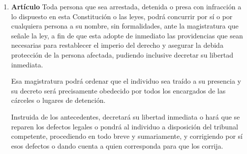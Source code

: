 \documentclass[11pt, a4paper]{article}
\begin{document}
\begin{enumerate}
\item \textbf{Artículo} \newline
Toda persona que sea arrestada, detenida o presa con infracción a lo dispuesto en esta Constitución o las leyes, podrá concurrir por sí o por cualquiera persona a su nombre, sin formalidades, ante la magistratura que señale la ley, a fin de que esta adopte de inmediato las providencias que sean necesarias para restablecer el imperio del derecho y asegurar la debida protección de la persona afectada, pudiendo inclusive decretar su libertad inmediata. 

Esa magistratura podrá ordenar que el individuo sea traído a su presencia y su decreto será precisamente obedecido por todos los encargados de las cárceles o lugares de detención. 

Instruida de los antecedentes, decretará su libertad inmediata o hará que se reparen los defectos legales o pondrá al individuo a disposición del tribunal competente, procediendo en todo breve y sumariamente, y corrigiendo por sí esos defectos o dando cuenta a quien corresponda para que los corrija. 


\end{enumerate}
\end{document}
